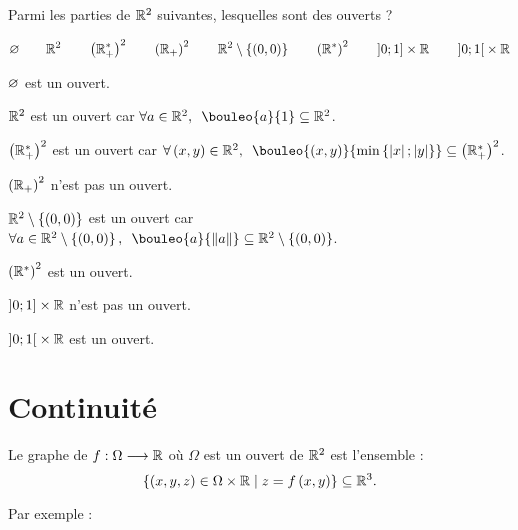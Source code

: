 \begin{exoex}
Parmi les parties de \(\mathbb{R}^2\) suivantes, lesquelles sont des ouverts ?

\[\varnothing\qquad\mathbb{R}^2\qquad\left(\mathbb{R}_+^*\right)^2\qquad\left(\mathbb{R}_+\right)^2\qquad\mathbb{R}^2\setminus\left\lbrace\left(0,0\right)\right\rbrace\qquad\left(\mathbb{R}^*\right)^2\qquad\left]0;1\right]\times\mathbb{R}\qquad\left]0;1\right[\times\mathbb{R}\]
\end{exoex}

\begin{corr}
\(\varnothing\) est un ouvert.

\(\mathbb{R}^2\) est un ouvert car \(\quantifs{\forall a\in\R^2}\bouleo{a}{1}\subset\R^2\).

\(\left(\mathbb{R}_+^*\right)^2\) est un ouvert car \(\quantifs{\forall\paren{x,y}\in\R^2}\bouleo{\paren{x,y}}{\min\accol{\abs{x};\abs{y}}}\subset\paren{\Rps}^2\).

\(\left(\mathbb{R}_+\right)^2\) n'est pas un ouvert.

\(\mathbb{R}^2\setminus\left\lbrace\left(0,0\right)\right\rbrace\) est un ouvert car \(\quantifs{\forall a\in\R^2\excluant\accol{\paren{0,0}}}\bouleo{a}{\norme{a}}\subset\R^2\excluant\accol{\paren{0,0}}\).

\(\left(\mathbb{R}^*\right)^2\) est un ouvert.

\(\left]0;1\right]\times\mathbb{R}\) n'est pas un ouvert.

\(\left]0;1\right[\times\mathbb{R}\) est un ouvert.
\end{corr}

\section{Continuité}

Le graphe de \(f:\Omega\longrightarrow\mathbb{R}\) où \(\Omega\) est un ouvert de \(\mathbb{R}^2\) est l'ensemble : \[\left\lbrace\left(x,y,z\right)\in\Omega\times\mathbb{R}\;\middle|\; z=f\left(x,y\right)\right\rbrace\subseteq\mathbb{R}^3.\]

Par exemple :

\begin{center}
\end{center}

